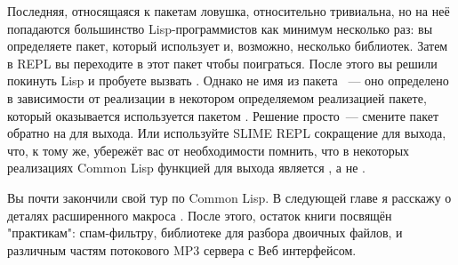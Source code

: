 Последняя, относящаяся к пакетам ловушка, относительно тривиальна, но на неё попадаются
большинство Lisp-программистов как минимум несколько раз: вы определяете пакет, который
использует  и, возможно, несколько библиотек. Затем в REPL вы переходите
в этот пакет чтобы поиграться. После этого вы решили покинуть Lisp и пробуете вызвать
. Однако  не имя из пакета ~--- оно определено в
зависимости от реализации в некотором определяемом реализацией пакете, который оказывается
используется пакетом .  Решение просто~--- смените пакет обратно на
 для выхода. Или используйте SLIME REPL сокращение для выхода, что, к тому
же, убережёт вас от необходимости помнить, что в некоторых реализациях Common Lisp
функцией для выхода является , а не .

Вы почти закончили свой тур по Common Lisp. В следующей главе я расскажу о деталях
расширенного макроса . После этого, остаток книги посвящён "практикам":
спам-фильтру, библиотеке для разбора двоичных файлов, и различным частям потокового MP3
сервера с Веб интерфейсом.

